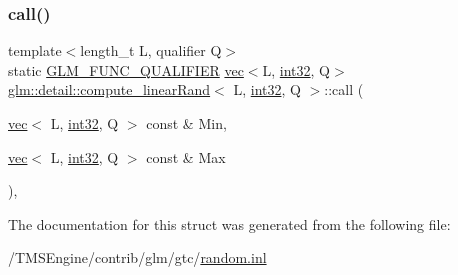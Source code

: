 \subsubsection{\texorpdfstring{call()}{call()}}
{\footnotesize\ttfamily template$<$length\+\_\+t L, qualifier Q$>$ \\
static \hyperlink{setup_8hpp_a33fdea6f91c5f834105f7415e2a64407}{G\+L\+M\+\_\+\+F\+U\+N\+C\+\_\+\+Q\+U\+A\+L\+I\+F\+I\+ER} \hyperlink{structglm_1_1vec}{vec}$<$L, \hyperlink{namespaceglm_1_1detail_a9f85b4efeca416cdcec2fd08939a2e17}{int32}, Q$>$ \hyperlink{structglm_1_1detail_1_1compute__linear_rand}{glm\+::detail\+::compute\+\_\+linear\+Rand}$<$ L, \hyperlink{namespaceglm_1_1detail_a9f85b4efeca416cdcec2fd08939a2e17}{int32}, Q $>$\+::call (\begin{DoxyParamCaption}\item[{\hyperlink{structglm_1_1vec}{vec}$<$ L, \hyperlink{namespaceglm_1_1detail_a9f85b4efeca416cdcec2fd08939a2e17}{int32}, Q $>$ const \&}]{Min,  }\item[{\hyperlink{structglm_1_1vec}{vec}$<$ L, \hyperlink{namespaceglm_1_1detail_a9f85b4efeca416cdcec2fd08939a2e17}{int32}, Q $>$ const \&}]{Max }\end{DoxyParamCaption})\hspace{0.3cm}{\ttfamily [inline]}, {\ttfamily [static]}}



The documentation for this struct was generated from the following file\+:\begin{DoxyCompactItemize}
\item 
/\+T\+M\+S\+Engine/contrib/glm/gtc/\hyperlink{random_8inl}{random.\+inl}\end{DoxyCompactItemize}
